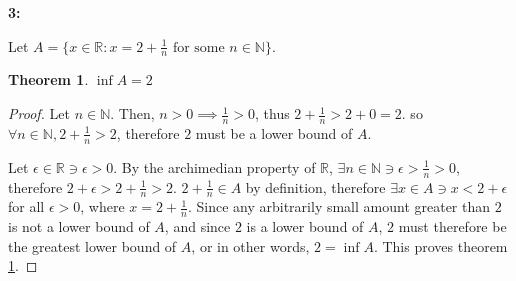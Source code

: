 \documentclass{article}
\newcommand{\reals}{\mathbb{R}}
\newcommand{\nats}{\mathbb{N}}
\newtheorem{thm}{Theorem}
\begin{document}
\textbf{3:}

Let $A = \{ x \in \reals: x = 2 + \frac{1}{n} \textrm{ for some } n \in \nats\}$.

\begin{thm} \label{thm3}
	$\inf A = 2$
\end{thm}

\begin{proof}
	Let $n \in \nats$.
	Then, $n > 0 \implies \frac{1}{n} > 0$,
	thus $2 + \frac{1}{n} > 2 + 0 = 2$.
	so $\forall n \in \nats, 2 + \frac{1}{n} > 2$,
	therefore $2$ must be a lower bound of $A$.

	Let $\epsilon \in \reals \ni \epsilon > 0$.
	By the archimedian property of $\reals$,
	$\exists n \in \nats \ni \epsilon > \frac{1}{n} > 0$,
	therefore $2 + \epsilon > 2 + \frac{1}{n} > 2$.
	$2 + \frac{1}{n} \in A$ by definition,
	therefore $\exists x \in A \ni x < 2 + \epsilon$
	for all $\epsilon > 0$,
	where $x = 2 + \frac{1}{n}$.
	Since any arbitrarily small amount greater than $2$
	is not a lower bound of $A$,
	and since $2$ is a lower bound of $A$,
	$2$ must therefore be the greatest lower bound of $A$,
	or in other words, $2 = \inf A$.
	This proves theorem \ref{thm3}.

\end{proof}
\end{document}
